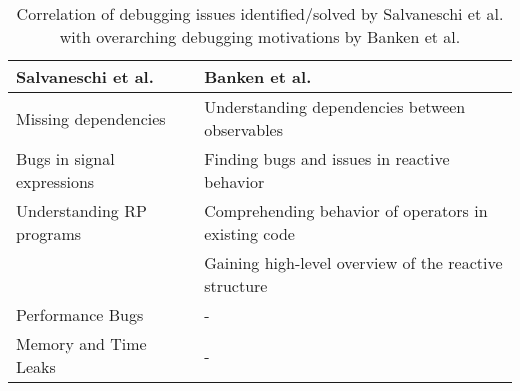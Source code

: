 \begin{table}
  \caption{Correlation of debugging issues identified/solved by Salvaneschi et al. with overarching debugging motivations by Banken et al.}

  \newcommand{\wrap}[1]{\parbox{.45\linewidth}{\vspace{1.5mm}#1\vspace{1mm}}}
  \begin{tabular}[t]{|l|l|}
  \hline
  \small{\bf{Salvaneschi et al.}}              & \small{\bf{Banken et al.}}                                           \\ \hline
  \small{\wrap{Missing dependencies}}          & \small{\wrap{Understanding dependencies between observables}}        \\ \hline
  \small{\wrap{Bugs in signal expressions}}    & \small{\wrap{Finding bugs and issues in reactive behavior}}          \\ \hline
  \small{\wrap{Understanding RP programs}}     & \small{\wrap{Comprehending behavior of operators in existing code}}  \\
                                               & \small{\wrap{Gaining high-level overview of the reactive structure}} \\ \hline
  \small{\wrap{Performance Bugs}}              & -                                                                    \\ \hline
  \small{\wrap{Memory and Time Leaks}}         & -                                                                    \\ \hline
  \end{tabular}
\end{table}
